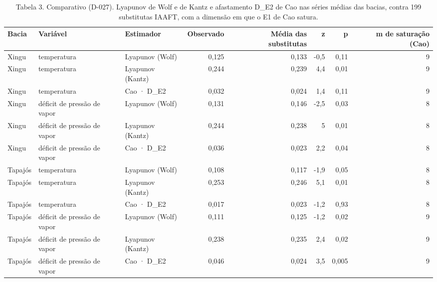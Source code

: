 \begin{table}
\caption{Tabela 3. Comparativo (D-027). Lyapunov de Wolf e de Kantz e afastamento D_E2 de Cao nas séries médias das bacias, contra 199 substitutas IAAFT, com a dimensão em que o E1 de Cao satura.}
\label{tab:06_surrogates::estimadores_bacia}
\begin{tabular}{lllrrrrr}
\toprule
Bacia & Variável & Estimador & Observado & Média das substitutas & z & p & m de saturação (Cao) \\
\midrule
Xingu & temperatura & Lyapunov (Wolf) & 0,125 & 0,133 & -0,5 & 0,11 & 9 \\
Xingu & temperatura & Lyapunov (Kantz) & 0,244 & 0,239 & 4,4 & 0,01 & 9 \\
Xingu & temperatura & Cao · D\_E2 & 0,032 & 0,024 & 1,4 & 0,11 & 9 \\
Xingu & déficit de pressão de vapor & Lyapunov (Wolf) & 0,131 & 0,146 & -2,5 & 0,03 & 8 \\
Xingu & déficit de pressão de vapor & Lyapunov (Kantz) & 0,244 & 0,238 & 5 & 0,01 & 8 \\
Xingu & déficit de pressão de vapor & Cao · D\_E2 & 0,036 & 0,023 & 2,2 & 0,04 & 8 \\
Tapajós & temperatura & Lyapunov (Wolf) & 0,108 & 0,117 & -1,9 & 0,05 & 8 \\
Tapajós & temperatura & Lyapunov (Kantz) & 0,253 & 0,246 & 5,1 & 0,01 & 8 \\
Tapajós & temperatura & Cao · D\_E2 & 0,017 & 0,023 & -1,2 & 0,93 & 8 \\
Tapajós & déficit de pressão de vapor & Lyapunov (Wolf) & 0,111 & 0,125 & -1,2 & 0,02 & 9 \\
Tapajós & déficit de pressão de vapor & Lyapunov (Kantz) & 0,238 & 0,235 & 2,4 & 0,02 & 9 \\
Tapajós & déficit de pressão de vapor & Cao · D\_E2 & 0,046 & 0,024 & 3,5 & 0,005 & 9 \\
\bottomrule
\end{tabular}
\end{table}

